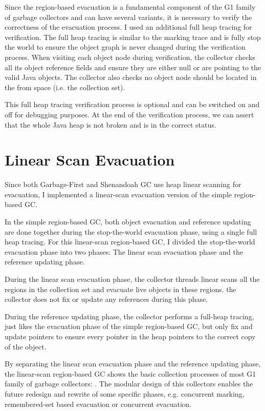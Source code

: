 Since the region-based evacuation is a fundamental component of the G1 family of garbage collectors
and can have several variants, it is necessary to verify the correctness of the evacuation process.
I used an additional full heap tracing for verification. The full heap tracing is
similar to the marking trace and is fully stop the world to ensure the object graph is never changed
during the verification process.
When visiting each object node during verification, the collector checks all its object reference fields
and ensure they are either null or are pointing to the valid Java objects.
The collector also checks no object node should be located in the from space (i.e. the collection set).

This full heap tracing verification process is optional and can be switched on and off for
debugging purposes.
At the end of the verification process, we can assert that the whole Java heap is
not broken and is in the correct status.

\section{Linear Scan Evacuation}
\label{sec:linearscangc}

Since both Garbage-First and Shenandoah GC use heap linear scanning for evacuation,
I implemented a linear-scan evacuation version of the simple region-based GC.

In the simple region-based GC, both object evacuation and reference updating are
done together during the stop-the-world evacuation phase, using a single full heap tracing.
For this linear-scan region-based GC, I divided the stop-the-world evacuation phase into
two phases: The linear scan evacuation phase and the reference updating phase.

During the linear scan evacuation phase, the collector threads linear scans all the regions
in the collection set and evacuate live objects in these regions. the collector does not
fix or update any references during this phase.

During the reference updating phase, the collector performs a full-heap tracing,
just likes the evacuation phase of the simple region-based GC, but only fix and update
pointers to ensure every pointer in the heap pointers to the correct copy of the object.

By separating the linear scan evacuation phase and the reference updating phase,
the linear-scan region-based GC shows the basic collection processes of most G1 family
of garbage collectors: .
The modular design of this collectors enables the future redesign and rewrite of some specific
phases, e.g. concurrent marking, remembered-set based evacuation or concurrent evacuation.

